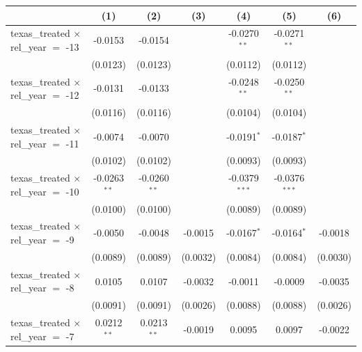 
\begingroup
\centering
\begin{tabular}{lcccccc}
   \toprule
                                                & (1)            & (2)            & (3)             & (4)             & (5)             & (6)\\  
   \midrule 
   texas\_treated $\times$ rel\_year $=$ -13    & -0.0153        & -0.0154        &                 & -0.0270$^{**}$  & -0.0271$^{**}$  &   \\   
                                                & (0.0123)       & (0.0123)       &                 & (0.0112)        & (0.0112)        &   \\   
   texas\_treated $\times$ rel\_year $=$ -12    & -0.0131        & -0.0133        &                 & -0.0248$^{**}$  & -0.0250$^{**}$  &   \\   
                                                & (0.0116)       & (0.0116)       &                 & (0.0104)        & (0.0104)        &   \\   
   texas\_treated $\times$ rel\_year $=$ -11    & -0.0074        & -0.0070        &                 & -0.0191$^{*}$   & -0.0187$^{*}$   &   \\   
                                                & (0.0102)       & (0.0102)       &                 & (0.0093)        & (0.0093)        &   \\   
   texas\_treated $\times$ rel\_year $=$ -10    & -0.0263$^{**}$ & -0.0260$^{**}$ &                 & -0.0379$^{***}$ & -0.0376$^{***}$ &   \\   
                                                & (0.0100)       & (0.0100)       &                 & (0.0089)        & (0.0089)        &   \\   
   texas\_treated $\times$ rel\_year $=$ -9     & -0.0050        & -0.0048        & -0.0015         & -0.0167$^{*}$   & -0.0164$^{*}$   & -0.0018\\   
                                                & (0.0089)       & (0.0089)       & (0.0032)        & (0.0084)        & (0.0084)        & (0.0030)\\   
   texas\_treated $\times$ rel\_year $=$ -8     & 0.0105         & 0.0107         & -0.0032         & -0.0011         & -0.0009         & -0.0035\\   
                                                & (0.0091)       & (0.0091)       & (0.0026)        & (0.0088)        & (0.0088)        & (0.0026)\\   
   texas\_treated $\times$ rel\_year $=$ -7     & 0.0212$^{**}$  & 0.0213$^{**}$  & -0.0019         & 0.0095          & 0.0097          & -0.0022\\   

\end{tabular}
